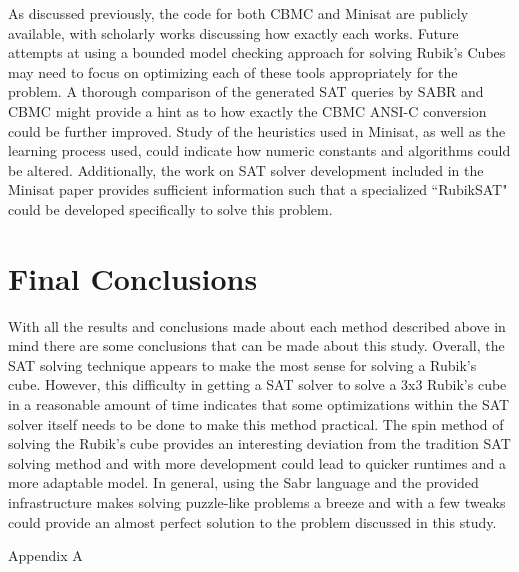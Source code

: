 \documentclass{article}
\begin{document}
\noindent As discussed previously, the code for both CBMC and Minisat are publicly available, with scholarly works discussing how exactly each works. Future attempts at using a bounded model checking approach for solving Rubik's Cubes may need to focus on optimizing each of these tools appropriately for the problem. A thorough comparison of the generated SAT queries by SABR and CBMC might provide a hint as to how exactly the CBMC ANSI-C conversion could be further improved. Study of the heuristics used in Minisat, as well as the learning process used, could indicate how numeric constants and algorithms could be altered. Additionally, the work on SAT solver development included in the Minisat paper provides 
sufficient information such that a specialized ``RubikSAT" could be developed specifically to solve this problem.


\newpage

\section{Final Conclusions}
With all the results and conclusions made about each method described above in mind there are some conclusions that can be made about this study. Overall, the SAT solving technique appears to make the most sense for solving a Rubik’s cube. However, this difficulty in getting a SAT solver to solve a 3x3 Rubik’s cube in a reasonable amount of time indicates that some optimizations within the SAT solver itself needs to be done to make this method practical. The spin method of solving the Rubik’s cube provides an interesting deviation from the tradition SAT solving method and with more development could lead to quicker runtimes and a more adaptable model. In general, using the Sabr language and the provided infrastructure makes solving puzzle-like problems a breeze and with a few tweaks could provide an almost perfect solution to the problem discussed in this study.

\pagebreak
\begin{center}
Appendix A
\end{center}
\end{document}
